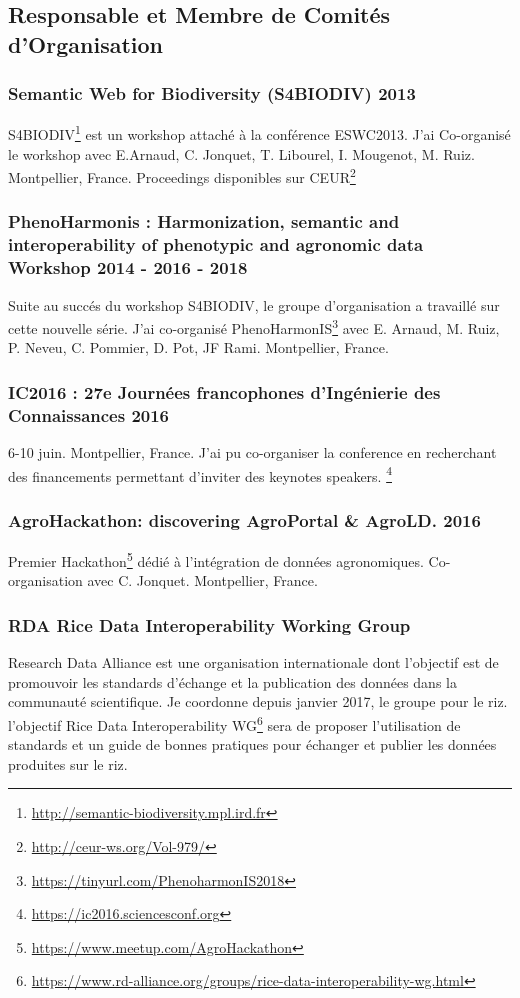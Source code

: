 \subsection*{Responsable et Membre de Comités d’Organisation}

\subsubsection*{Semantic Web for Biodiversity (S4BIODIV) 2013 } 
S4BIODIV\footnote{\url{http://semantic-biodiversity.mpl.ird.fr}} est un workshop attaché à la conférence ESWC2013. J'ai Co-organisé le workshop avec E.Arnaud, C. Jonquet, T. Libourel, I. Mougenot, M. Ruiz. Montpellier, France.  Proceedings disponibles sur CEUR\footnote{\url{http://ceur-ws.org/Vol-979/}}

\subsubsection*{PhenoHarmonis : Harmonization, semantic and interoperability of phenotypic and agronomic data Workshop 2014 - 2016 - 2018} Suite au succés du workshop S4BIODIV, le groupe d'organisation a travaillé sur cette nouvelle série.  J'ai co-organisé PhenoHarmonIS\footnote{\url{https://tinyurl.com/PhenoharmonIS2018}} avec E. Arnaud, M. Ruiz, P. Neveu, C. Pommier, D. Pot, JF Rami. Montpellier, France.


\subsubsection*{IC2016 : 27e Journées francophones d'Ingénierie des Connaissances  2016 } 6-10 juin. Montpellier, France.  J'ai pu co-organiser la conference en recherchant des financements permettant d'inviter des keynotes speakers. 
 \footnote{\url{https://ic2016.sciencesconf.org}}

\subsubsection*{AgroHackathon: discovering AgroPortal \& AgroLD. 2016 } Premier Hackathon\footnote{\url{https://www.meetup.com/AgroHackathon}} dédié à l’intégration de données agronomiques. Co-organisation avec C. Jonquet. Montpellier, France.


\subsubsection*{RDA Rice Data Interoperability Working Group} Research Data Alliance est une organisation internationale dont l'objectif est de promouvoir les standards d’échange et la publication des données dans la communauté scientifique. Je coordonne depuis janvier 2017, le groupe pour le riz. l'objectif Rice Data Interoperability WG\footnote{\url{https://www.rd-alliance.org/groups/rice-data-interoperability-wg.html}} sera de proposer l’utilisation de standards et un guide de bonnes pratiques pour échanger et publier les données produites sur le riz. 


